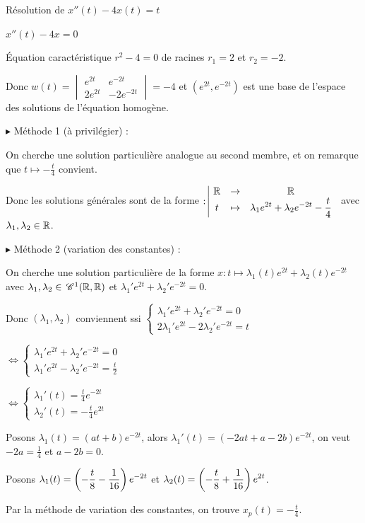 \begin{exemple}
    Résolution de $x''(t) - 4x(t) = t$

     $x''(t) - 4x = 0$

    \svspace \'Equation caractéristique $r^2 - 4 = 0$ de racines $r_1 = 2$ et $r_2 = -2$.

    Donc $w(t) = \begin{vmatrix}
    e^{2t} & e^{-2t} \\
    2e^{2t} & -2e^{-2t}
    \end{vmatrix} = -4$ et $(e^{2t}, e^{-2t})$ est une base de l'espace des solutions de l'équation homogène.


    \svspace $\blacktriangleright$ Méthode 1 (à privilégier) : 

    On cherche une solution particulière analogue au second membre, et on remarque que $t \mapsto - \frac t 4$ convient. 

    Donc les solutions générales sont de la forme $: \space \begin{array}{|ccc} \displaystyle \mathbb{R} & \to & \displaystyle \mathbb{R} \\ \displaystyle t & \mapsto & \displaystyle \lambda_1 e^{2t} + \lambda_2 e^{-2t} - \frac t 4 \end{array}$ avec $\lambda_1, \lambda_2 \in \mathbb{R}$.

    \lvspace $\blacktriangleright$ Méthode 2 (variation des constantes) :

    On cherche une solution particulière de la forme $x : t \mapsto \lambda_1(t) e^{2t} + \lambda_2(t) e^{-2t}$ 
    avec $\lambda_1, \lambda_2 \in \,\mathscr C^{1}(\mathbb{R}, \mathbb{R})$ et $\lambda_1' e^{2t} + \lambda_2' e^{-2t} = 0$.

    Donc $(\lambda_1, \lambda_2)$ conviennent ssi 
    $\begin{cases}
        \lambda_1' e^{2t} + \lambda_2' e^{-2t} = 0 \\
        2 \lambda_1' e^{2t} - 2 \lambda_2' e^{-2t} = t
    \end{cases}$ 

    $\Leftrightarrow \begin{cases}
    \lambda_1' e^{2t} + \lambda_2' e^{-2t} = 0 \\
    \lambda_1' e^{2t} - \lambda_2' e^{-2t} = \frac t 2
    \end{cases}$

    $\Leftrightarrow \begin{cases}
    \lambda_1'(t) = \frac t 4 e^{-2t} \\
    \lambda_2'(t) = -\frac t 4 e^{2t}
    \end{cases}$

    Posons $\lambda_1(t) = (at + b) e^{-2t}$, alors $\lambda_1'(t) = (-2a t + a - 2b) e^{-2t}$,
    on veut $-2a = \frac 1 4$ et $a - 2b = 0$.

    Posons $\lambda_1(t) = \displaystyle \left( - \frac t 8 - \frac 1 {16} \right) e^{-2t}$
    et $\lambda_2(t) = \displaystyle \left( - \frac t 8 + \frac 1 {16} \right) e^{2t}$. 

    Par la méthode de variation des constantes, on trouve $x_p(t) = - \frac t 4$. 
\end{exemple}

